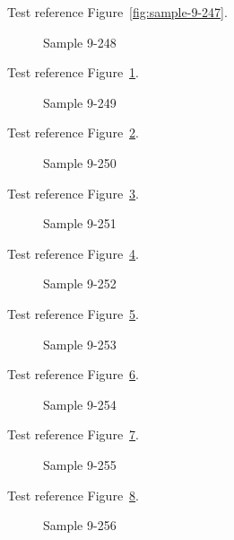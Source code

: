 Test reference Figure~\ref{fig:sample-9-247}.

\begin{figure}[tbhp]
\caption{Sample 9-248}
\label{fig:sample-9-248}
\end{figure}

Test reference Figure~\ref{fig:sample-9-248}.

\begin{figure}[tbhp]
\caption{Sample 9-249}
\label{fig:sample-9-249}
\end{figure}

Test reference Figure~\ref{fig:sample-9-249}.

\begin{figure}[tbhp]
\caption{Sample 9-250}
\label{fig:sample-9-250}
\end{figure}

Test reference Figure~\ref{fig:sample-9-250}.

\begin{figure}[tbhp]
\caption{Sample 9-251}
\label{fig:sample-9-251}
\end{figure}

Test reference Figure~\ref{fig:sample-9-251}.

\begin{figure}[tbhp]
\caption{Sample 9-252}
\label{fig:sample-9-252}
\end{figure}

Test reference Figure~\ref{fig:sample-9-252}.

\begin{figure}[tbhp]
\caption{Sample 9-253}
\label{fig:sample-9-253}
\end{figure}

Test reference Figure~\ref{fig:sample-9-253}.

\begin{figure}[tbhp]
\caption{Sample 9-254}
\label{fig:sample-9-254}
\end{figure}

Test reference Figure~\ref{fig:sample-9-254}.

\begin{figure}[tbhp]
\caption{Sample 9-255}
\label{fig:sample-9-255}
\end{figure}

Test reference Figure~\ref{fig:sample-9-255}.

\begin{figure}[tbhp]
\caption{Sample 9-256}
\label{fig:sample-9-256}
\end{figure}

